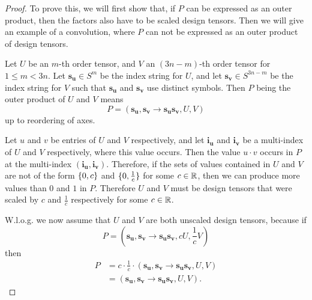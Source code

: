 \bigskip
\begin{proof}
    \small
    To prove this, we will first show that, if $P$ can be expressed as an outer product, then the factors also have to be scaled design tensors.
    Then we will give an example of a convolution, where $P$ can not be expressed as an outer product of design tensors.

    Let $U$ be an $m$-th order tensor, and $V$ an $(3n-m)$-th order tensor for $1 \leq m < 3n$.
    Let $\bm{s_u} \in S^{m}$ be the index string for $U$,
    and let $\bm{s_v} \in S^{3n - m}$ be the index string for $V$ such that $\bm{s_u}$ and $\bm{s_v}$ use distinct symbols.
    Then $P$ being the outer product of $U$ and $V$ means
    $$P = (\bm{s_u}, \bm{s_v} \rightarrow \bm{s_u}\bm{s_v}, U, V)$$
    up to reordering of axes.

    Let $u$ and $v$ be entries of $U$ and $V$ respectively, and let $\bm{i_u}$ and $\bm{i_v}$ be a multi-index of $U$ and $V$ respectively, where this value occurs.
    Then the value $u \cdot v$ occurs in $P$ at the multi-index $(\bm{i_u}, \bm{i_v})$.
    Therefore, if the sets of values contained in $U$ and $V$ are not of the form $\lbrace 0, c \rbrace$ and $\lbrace 0, \frac{1}{c} \rbrace$ for some $c \in \mathbb{R}$, then we can produce more values than $0$ and $1$ in $P$.
    Therefore $U$ and $V$ must be design tensors that were scaled by $c$ and $\frac{1}{c}$ respectively for some $c \in \mathbb{R}$.

    W.l.o.g. we now assume that $U$ and $V$ are both unscaled design tensors, because if
    $$P = (\bm{s_u}, \bm{s_v} \rightarrow \bm{s_u}\bm{s_v}, c U, \frac{1}{c} V)$$
    then
    \begin{align*}
        P & = c\cdot \frac{1}{c} \cdot (\bm{s_u}, \bm{s_v} \rightarrow \bm{s_u}\bm{s_v}, U, V) \\
          & = (\bm{s_u}, \bm{s_v} \rightarrow \bm{s_u}\bm{s_v}, U, V).
    \end{align*}


\end{proof}
